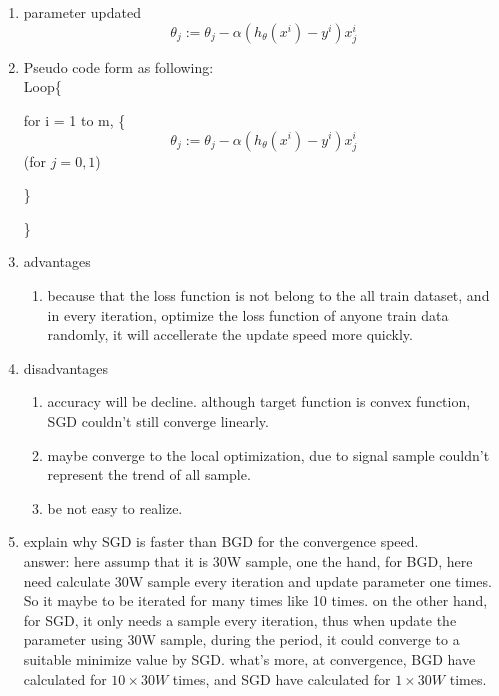 \documentclass[12pt]{ctexart}%
\begin{document}
\begin{itemize}
\begin{enumerate}[(1)]
\begin{enumerate}
						\item parameter updated
							\begin{equation}
								\theta_j := \theta_j - \alpha(h_\theta(x^i) - y^i)x_j^i
							\end{equation}
							
						\item Pseudo code form as following:\\
						Loop\{
						
						\qquad for i = 1 to m, \{
								$$\theta_j := \theta_j - \alpha(h_\theta(x^i) - y^i)x_j^i$$
								\qquad \qquad \qquad(for $j = 0,1$)
								
						\qquad \}
						
						\}
						
						\item advantages
							\begin{enumerate}
								\item because that the loss function is not belong to the all train dataset, and in every iteration, optimize the loss function of anyone train data randomly,  it will accellerate the update speed more quickly.
							\end{enumerate}
						
						\item disadvantages
							\begin{enumerate}
								\item accuracy will be decline. although target function is convex function, SGD couldn't still converge linearly. 
								\item maybe converge to the local optimization, due to signal sample couldn't represent the trend of all sample.
								\item be not easy to realize.
							\end{enumerate}
						
						\item explain why SGD is faster than BGD for the convergence speed.\\
							answer:  here assump that it is 30W sample, one the hand, for BGD, here need calculate 30W sample every iteration and update parameter one times. So it maybe to be iterated for many times like 10 times. on the other hand, for SGD, it only needs a sample every iteration, thus when update the parameter using 30W sample, during the period, it could converge to a suitable minimize value by SGD.
							what's more, at convergence, BGD have calculated for $10\times 30W$ times, and SGD have calculated for $1\times 30W$ times. 
							

\end{enumerate}
\end{enumerate}
\end{itemize}
\end{document}
